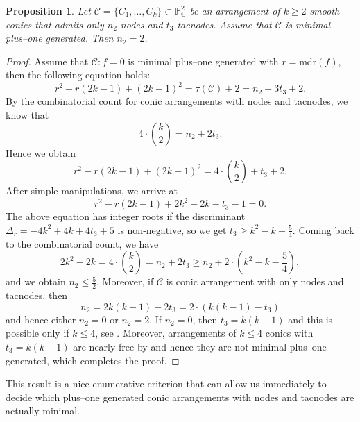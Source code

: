 \documentclass[11pt]{article}
\theoremstyle{plain}
\newtheorem{proposition}[thm]{Proposition}
\theoremstyle{definition}
\begin{document}
\begin{proposition}
    Let $\mathcal{C}=\{C_1, \ldots,C_k\}\subset\mathbb{P}^2_{\mathbb{C}}$ be an arrangement of $k\geq 2$ smooth conics that admits only $n_2$ nodes and $t_3$ tacnodes. Assume that $\mathcal{C}$ is minimal plus--one generated. Then $n_2=2$.
\end{proposition}
\begin{proof}
    Assume that $\mathcal{C}: f=0$ is minimal plus--one generated with $r=\text{mdr}(f)$, then the following equation holds:
    $$r^2-r(2k-1)+(2k-1)^2=\tau(\mathcal{C})+2=n_2+3t_3+2.$$
     By the combinatorial count for conic arrangements with nodes and tacnodes, we know that
    $$4\cdot \binom{k}{2}=n_2+2t_3.$$
    Hence we obtain
    $$r^2-r(2k-1)+(2k-1)^2=4\cdot \binom{k}{2}+t_3+2.$$
    After simple manipulations, we arrive at
    $$r^2-r(2k-1)+2k^2-2k-t_3-1=0.$$
    The above equation has integer roots if the discriminant
    $\Delta_r=-4k^2+4k+4t_3+5$ is non-negative, so we get $t_3\geq k^2-k-\frac{5}{4}$.
    Coming back to the combinatorial count, we have 
    $$2k^2-2k=4\cdot \binom{k}{2}=n_2+2t_3\geq n_2+2\cdot \left(k^2-k-\frac{5}{4}\right),$$
    and we obtain $n_2\leq \frac{5}{2}$. Moreover, if $\mathcal{C}$ is conic arrangement with only nodes and tacnodes, then 
    $$n_{2} = 2k(k-1)-2t_{3} = 2\cdot(k(k-1)-t_{3})$$
    and hence either $n_{2}=0$ or $n_{2}=2$.
    If $n_{2}=0$, then $t_{3}=k(k-1)$ and this is possible only if $k\leq 4$, see \cite[Section 7]{GM}. Moreover, arrangements of $k\leq 4$ conics with $t_{3}=k(k-1)$ are nearly free by \cite[Proposition 1.6]{DJP} and hence they are not minimal plus--one generated, which completes the proof.
\end{proof}
This result is a nice enumerative criterion that can allow us immediately to decide which plus--one generated conic arrangements with nodes and tacnodes are actually minimal.
\end{document}
